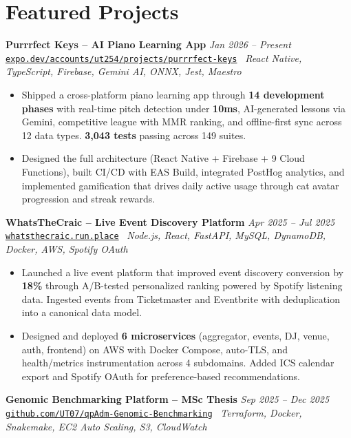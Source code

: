 \documentclass[10pt,a4paper]{article}
\newcommand{\projectentryurl}[5]{%
  \Needspace{3\baselineskip}%
  \textbf{#1} \hfill \textit{#2}\\[-0.15em]
  {\small\href{#3}{\texttt{#4}}} \textbar\ \textit{#5}\\[-0.25em]
}
\begin{document}
\clearpage
\section*{Featured Projects}
\projectentryurl{Purrrfect Keys -- AI Piano Learning App}{Jan 2026 -- Present}{https://expo.dev/accounts/ut254/projects/purrrfect-keys/builds/229bd252-c684-4af5-b39f-4f3623455a7e}{expo.dev/accounts/ut254/projects/purrrfect-keys}{React Native, TypeScript, Firebase, Gemini AI, ONNX, Jest, Maestro}
\begin{itemize}
  \item Shipped a cross-platform piano learning app through \textbf{14 development phases} with real-time pitch detection under \textbf{10ms}, AI-generated lessons via Gemini, competitive league with MMR ranking, and offline-first sync across 12 data types. \textbf{3,043 tests} passing across 149 suites.
  \item Designed the full architecture (React Native + Firebase + 9 Cloud Functions), built CI/CD with EAS Build, integrated PostHog analytics, and implemented gamification that drives daily active usage through cat avatar progression and streak rewards.
\end{itemize}
\vspace{0.20em}
\projectentryurl{WhatsTheCraic -- Live Event Discovery Platform}{Apr 2025 -- Jul 2025}{https://github.com/UT07/whatsthecraic}{whatsthecraic.run.place}{Node.js, React, FastAPI, MySQL, DynamoDB, Docker, AWS, Spotify OAuth}
\begin{itemize}
  \item Launched a live event platform that improved event discovery conversion by \textbf{18\%} through A/B-tested personalized ranking powered by Spotify listening data. Ingested events from Ticketmaster and Eventbrite with deduplication into a canonical data model.
  \item Designed and deployed \textbf{6 microservices} (aggregator, events, DJ, venue, auth, frontend) on AWS with Docker Compose, auto-TLS, and health/metrics instrumentation across 4 subdomains. Added ICS calendar export and Spotify OAuth for preference-based recommendations.
\end{itemize}
\vspace{0.20em}
\projectentryurl{Genomic Benchmarking Platform -- MSc Thesis}{Sep 2025 -- Dec 2025}{https://github.com/UT07/Performance-Optimization-and-Cost-Analysis-of-qpAdm-Genomic-Modeling}{github.com/UT07/qpAdm-Genomic-Benchmarking}{Terraform, Docker, Snakemake, EC2 Auto Scaling, S3, CloudWatch}
\end{document}
